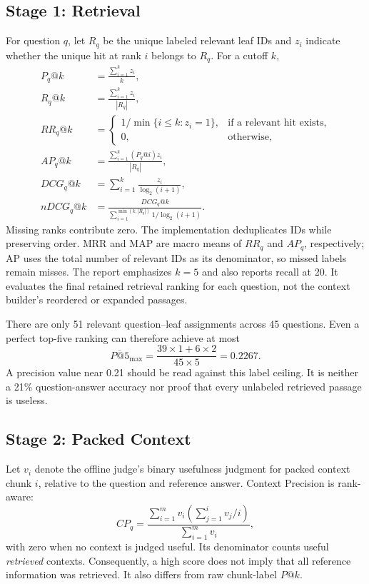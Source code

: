 \subsection{Stage 1: Retrieval}
For question $q$, let $R_q$ be the unique labeled relevant leaf IDs and $z_i$ indicate whether the unique hit at rank $i$ belongs to $R_q$. For a cutoff $k$,
\begin{align}
P_q@k&=\frac{\sum_{i=1}^{k}z_i}{k},\\
R_q@k&=\frac{\sum_{i=1}^{k}z_i}{|R_q|},\\
RR_q@k&=\begin{cases}1/\min\{i\leq k:z_i=1\},&\text{if a relevant hit exists},\\0,&\text{otherwise},\end{cases}\\
AP_q@k&=\frac{\sum_{i=1}^{k}(P_q@i)z_i}{|R_q|},\\
DCG_q@k&=\sum_{i=1}^{k}\frac{z_i}{\log_2(i+1)},\\
nDCG_q@k&=\frac{DCG_q@k}{\sum_{i=1}^{\min(k,|R_q|)}1/\log_2(i+1)}.
\end{align}
Missing ranks contribute zero. The implementation deduplicates IDs while preserving order. MRR and MAP are macro means of $RR_q$ and $AP_q$, respectively; AP uses the total number of relevant IDs as its denominator, so missed labels remain misses. The report emphasizes $k=5$ and also reports recall at 20. It evaluates the final retained retrieval ranking for each question, not the context builder's reordered or expanded passages.

There are only 51 relevant question--leaf assignments across 45 questions. Even a perfect top-five ranking can therefore achieve at most
\begin{equation}
\overline{P@5}_{\max}=\frac{39\times1+6\times2}{45\times5}=0.2267.
\end{equation}
A precision value near 0.21 should be read against this label ceiling. It is neither a 21\% question-answer accuracy nor proof that every unlabeled retrieved passage is useless.

\subsection{Stage 2: Packed Context}
Let $v_i$ denote the offline judge's binary usefulness judgment for packed context chunk $i$, relative to the question and reference answer. Context Precision is rank-aware:
\begin{equation}
CP_q=\frac{\sum_{i=1}^{m}v_i\left(\sum_{j=1}^{i}v_j/i\right)}{\sum_{i=1}^{m}v_i},
\end{equation}
with zero when no context is judged useful. Its denominator counts useful \emph{retrieved} contexts. Consequently, a high score does not imply that all reference information was retrieved. It also differs from raw chunk-label $P@k$.

